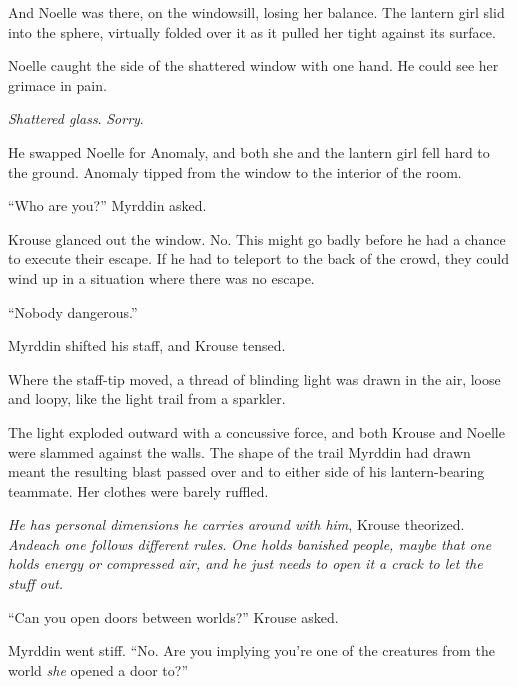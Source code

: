 And Noelle was there, on the windowsill, losing her balance.  The lantern girl slid into the sphere, virtually folded over it as it pulled her tight against its surface.



Noelle caught the side of the shattered window with one hand.  He could see her grimace in pain.



\emph{Shattered glass}.  \emph{Sorry}.



He swapped Noelle for Anomaly, and both she and the lantern girl fell hard to the ground.  Anomaly tipped from the window to the interior of the room.



``Who are you?'' Myrddin asked.



Krouse glanced out the window.  No.  This might go badly before he had a chance to execute their escape.  If he had to teleport to the back of the crowd, they could wind up in a situation where there was no escape.



``Nobody dangerous.''



Myrddin shifted his staff, and Krouse tensed.



Where the staff-tip moved, a thread of blinding light was drawn in the air, loose and loopy, like the light trail from a sparkler.



The light exploded outward with a concussive force, and both Krouse and Noelle were slammed against the walls.  The shape of the trail Myrddin had drawn meant the resulting blast passed over and to either side of his lantern-bearing teammate.  Her clothes were barely ruffled.



\emph{He has personal dimensions he carries around with him}, Krouse theorized.  \emph{And}\emph{each one follows different rules}.  \emph{One holds banished people, maybe that one holds energy or compressed air, and he just needs to open it a crack to let the stuff out.}



``Can you open doors between worlds?'' Krouse asked.



Myrddin went stiff.  ``No.  Are you implying you're one of the creatures from the world \emph{she} opened a door to?''



